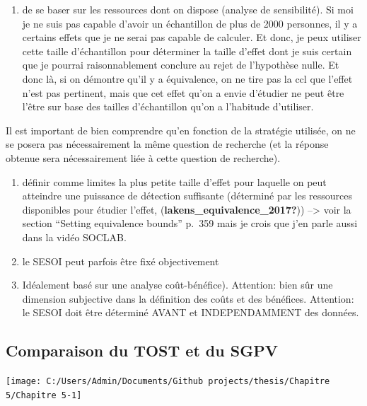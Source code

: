 \documentclass[
  english,
  man]{apa6}
\providecommand{\tightlist}{%
  \setlength{\itemsep}{0pt}\setlength{\parskip}{0pt}}
\begin{document}
\begin{enumerate}
\def\labelenumi{\arabic{enumi})}
\setcounter{enumi}{2}
\tightlist
\item
  de se baser sur les ressources dont on dispose (analyse de sensibilité). Si moi je ne suis pas capable d'avoir un échantillon de plus de 2000 personnes, il y a certains effets que je ne serai pas capable de calculer. Et donc, je peux utiliser cette taille d'échantillon pour déterminer la taille d'effet dont je suis certain que je pourrai raisonnablement conclure au rejet de l'hypothèse nulle. Et donc là, si on démontre qu'il y a équivalence, on ne tire pas la ccl que l'effet n'est pas pertinent, mais que cet effet qu'on a envie d'étudier ne peut être l'être sur base des tailles d'échantillon qu'on a l'habitude d'utiliser.
\end{enumerate}

Il est important de bien comprendre qu'en fonction de la stratégie utilisée, on ne se posera pas nécessairement la même question de recherche (et la réponse obtenue sera nécessairement liée à cette question de recherche).

\begin{enumerate}
\def\labelenumi{\arabic{enumi})}
\tightlist
\item
  définir comme limites la plus petite taille d'effet pour laquelle on peut atteindre une puissance de détection suffisante (déterminé par les ressources disponibles pour étudier l'effet, (\textbf{lakens\_equivalence\_2017?})) --\textgreater{} voir la section ``Setting equivalence bounds'' p.~359 mais je crois que j'en parle aussi dans la vidéo SOCLAB.\\
\item
  le SESOI peut parfois être fixé objectivement
\item
  Idéalement basé sur une analyse coût-bénéfice). Attention: bien sûr une dimension subjective dans la définition des coûts et des bénéfices.
  Attention: le SESOI doit être déterminé AVANT et INDEPENDAMMENT des données.
\end{enumerate}

\hypertarget{comparaison-du-tost-et-du-sgpv}{%
\subsection{Comparaison du TOST et du SGPV}\label{comparaison-du-tost-et-du-sgpv}}

\begin{center}\texttt{[image: C:/Users/Admin/Documents/Github projects/thesis/Chapitre 5/Chapitre 5-1]} \end{center}
\end{document}
